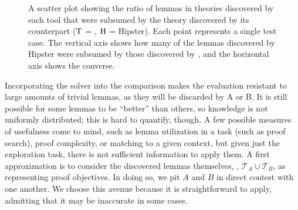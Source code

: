 \begin{figure}[t]
    
    
    \caption[A scatter plot showing the ratio of lemmas in theories discovered by each
tool]{A scatter plot showing the ratio of lemmas in theories discovered by each tool that were subsumed by the theory discovered by its counterpart ($\textrm{T}$ = \TheSy, $\textrm{H}$ = Hipster). Each point represents a single test case.
    The vertical axis shows how many of the lemmas discovered by Hipster were subsumed by those discovered by \TheSy, and the horizontal axis shows the converse.}
    \label{results:ratio_chart}
\end{figure}

Incorporating the solver into the comparison makes the evaluation resistant to large amounts of trivial lemmas, as they will be discarded by A or B.
It is still possible for some lemmas to be ``better'' than others, so knowledge is not uniformly distributed; this is hard to quantify, though.
A few possible measures of usefulness come to mind, such as lemma utilization in a task (such as proof search), proof complexity, or matching to a given context, but given just the exploration task, there is not sufficient information to apply them.
A first approximation is to consider the discovered lemmas themselves, \ie,
$\mathcal{T}_A \cup \mathcal{T}_B$, as representing proof objectives.
In doing so, we pit $A$ and $B$ in direct contest with one another.
We choose this avenue because it is straightforward to apply, admitting that it may be inaccurate in some cases.

